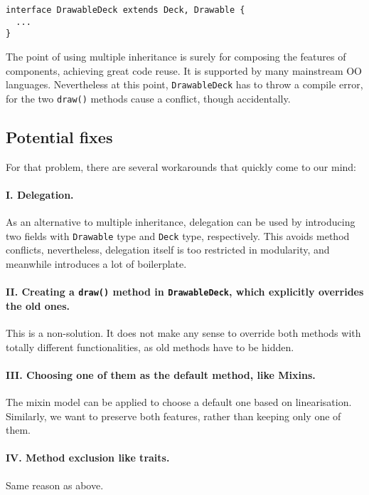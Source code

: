 \begin{lstlisting}
interface DrawableDeck extends Deck, Drawable {
  ...
} 
\end{lstlisting}
The point of using multiple inheritance is surely for composing the features of
components, achieving great code reuse. It is supported by many mainstream OO
languages. Nevertheless at this point, \lstinline|DrawableDeck| has to throw a compile
error, for the two \lstinline|draw()| methods cause a conflict, though accidentally.

\subsection{Potential fixes}

For that problem, there are several workarounds that quickly come to our mind:

\paragraph{I. Delegation.} As an alternative to multiple inheritance, delegation can be used by
introducing two fields with \lstinline|Drawable| type and \lstinline|Deck| type, respectively. This avoids
method conflicts, nevertheless, delegation itself is too restricted in modularity, and meanwhile
introduces a lot of boilerplate.

\paragraph{II. Creating a \lstinline|draw()| method in \lstinline|DrawableDeck|, which explicitly overrides the old ones.}
This is a non-solution. It does not make any sense to override both methods with totally different functionalities, as old
methods have to be hidden.

\paragraph{III. Choosing one of them as the default method, like Mixins.} The mixin model can be applied to choose a
default one based on linearisation. Similarly, we want to preserve both features, rather than keeping only one of them.

\paragraph{IV. Method exclusion like traits.} Same reason as above.

